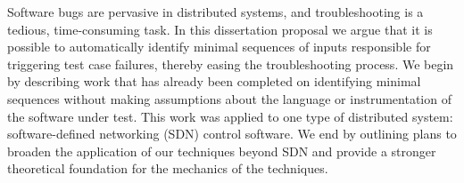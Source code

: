 Software bugs are pervasive in distributed systems,
and troubleshooting is a tedious, time-consuming task.
In this dissertation proposal we argue that it is possible to
automatically identify minimal sequences of inputs
responsible for triggering
test case failures, thereby easing the troubleshooting process.
We begin by describing work that has already been completed on
identifying minimal sequences without making assumptions about the
language or instrumentation of the software under test. This work was applied
to one type of distributed system: software-defined networking (SDN) control
software. We end by outlining plans to broaden the application of our techniques
beyond SDN and provide a stronger theoretical foundation for the mechanics
of the techniques.
